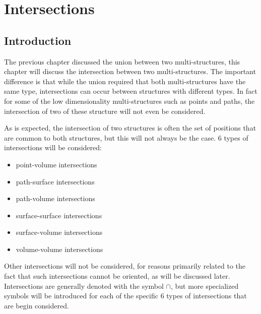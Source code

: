 

\chapter{Intersections}\label{chap:intersections}

\section{Introduction}

The previous chapter discussed the union between two multi-structures, this chapter will discuss the intersection between two multi-structures. The important difference is that while the union required that both multi-structures have the same type, intersections can occur between structures with different types. In fact for some of the low dimensionality multi-structures such as points and paths, the intersection of two of these structure will not even be considered.

As is expected, the intersection of two structures is often the set of positions that are common to both structures, but this will not always be the case. 6 types of intersections will be considered: 
\begin{itemize}
\item point-volume intersections 
\item path-surface intersections 
\item path-volume intersections 
\item surface-surface intersections 
\item surface-volume intersections 
\item volume-volume intersections
\end{itemize}
Other intersections will not be considered, for reasons primarily related to the fact that such intersections cannot be oriented, as will be discussed later. Intersections are generally denoted with the symbol \(\cap\), but more specialized symbols will be introduced for each of the specific 6 types of intersections that are begin considered. 

\vspace{5mm}

